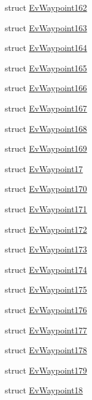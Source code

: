 \begin{DoxyCompactItemize}
\item 
struct \hyperlink{structmove__base__z__client_1_1EvWaypoint162}{Ev\+Waypoint162}
\item 
struct \hyperlink{structmove__base__z__client_1_1EvWaypoint163}{Ev\+Waypoint163}
\item 
struct \hyperlink{structmove__base__z__client_1_1EvWaypoint164}{Ev\+Waypoint164}
\item 
struct \hyperlink{structmove__base__z__client_1_1EvWaypoint165}{Ev\+Waypoint165}
\item 
struct \hyperlink{structmove__base__z__client_1_1EvWaypoint166}{Ev\+Waypoint166}
\item 
struct \hyperlink{structmove__base__z__client_1_1EvWaypoint167}{Ev\+Waypoint167}
\item 
struct \hyperlink{structmove__base__z__client_1_1EvWaypoint168}{Ev\+Waypoint168}
\item 
struct \hyperlink{structmove__base__z__client_1_1EvWaypoint169}{Ev\+Waypoint169}
\item 
struct \hyperlink{structmove__base__z__client_1_1EvWaypoint17}{Ev\+Waypoint17}
\item 
struct \hyperlink{structmove__base__z__client_1_1EvWaypoint170}{Ev\+Waypoint170}
\item 
struct \hyperlink{structmove__base__z__client_1_1EvWaypoint171}{Ev\+Waypoint171}
\item 
struct \hyperlink{structmove__base__z__client_1_1EvWaypoint172}{Ev\+Waypoint172}
\item 
struct \hyperlink{structmove__base__z__client_1_1EvWaypoint173}{Ev\+Waypoint173}
\item 
struct \hyperlink{structmove__base__z__client_1_1EvWaypoint174}{Ev\+Waypoint174}
\item 
struct \hyperlink{structmove__base__z__client_1_1EvWaypoint175}{Ev\+Waypoint175}
\item 
struct \hyperlink{structmove__base__z__client_1_1EvWaypoint176}{Ev\+Waypoint176}
\item 
struct \hyperlink{structmove__base__z__client_1_1EvWaypoint177}{Ev\+Waypoint177}
\item 
struct \hyperlink{structmove__base__z__client_1_1EvWaypoint178}{Ev\+Waypoint178}
\item 
struct \hyperlink{structmove__base__z__client_1_1EvWaypoint179}{Ev\+Waypoint179}
\item 
struct \hyperlink{structmove__base__z__client_1_1EvWaypoint18}{Ev\+Waypoint18}
\item 

\end{DoxyCompactItemize}
